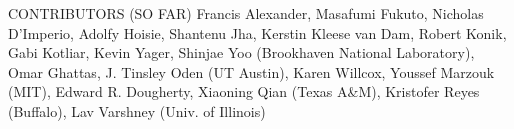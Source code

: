 \documentclass[11pt]{article}
\begin{document}
\newpage

\begin{center}
CONTRIBUTORS (SO FAR)
\normalsize Francis Alexander, Masafumi Fukuto, Nicholas D'Imperio, Adolfy Hoisie,
Shantenu Jha, Kerstin Kleese van Dam, Robert Konik, Gabi Kotliar,
Kevin Yager, Shinjae Yoo (Brookhaven National Laboratory), Omar
Ghattas, J. Tinsley Oden (UT Austin), Karen Willcox, Youssef Marzouk
(MIT), Edward R. Dougherty, Xiaoning Qian (Texas A\&M), Kristofer
Reyes (Buffalo), Lav Varshney (Univ. of Illinois)

\end{center}
\end{document}
